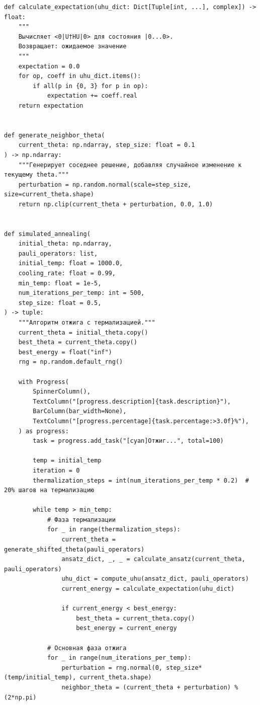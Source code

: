 \documentclass[a4paper]{report}
\begin{document}
\begin{lstlisting}
def calculate_expectation(uhu_dict: Dict[Tuple[int, ...], complex]) -> float:
    """
    Вычисляет <0|U†HU|0> для состояния |0...0>.
    Возвращает: ожидаемое значение
    """
    expectation = 0.0
    for op, coeff in uhu_dict.items():
        if all(p in {0, 3} for p in op):
            expectation += coeff.real
    return expectation


def generate_neighbor_theta(
    current_theta: np.ndarray, step_size: float = 0.1
) -> np.ndarray:
    """Генерирует соседнее решение, добавляя случайное изменение к текущему theta."""
    perturbation = np.random.normal(scale=step_size, size=current_theta.shape)
    return np.clip(current_theta + perturbation, 0.0, 1.0)


def simulated_annealing(
    initial_theta: np.ndarray,
    pauli_operators: list,
    initial_temp: float = 1000.0,
    cooling_rate: float = 0.99,
    min_temp: float = 1e-5,
    num_iterations_per_temp: int = 500,
    step_size: float = 0.5,
) -> tuple:
    """Алгоритм отжига с термализацией."""
    current_theta = initial_theta.copy()
    best_theta = current_theta.copy()
    best_energy = float("inf")
    rng = np.random.default_rng()

    with Progress(
        SpinnerColumn(),
        TextColumn("[progress.description]{task.description}"),
        BarColumn(bar_width=None),
        TextColumn("[progress.percentage]{task.percentage:>3.0f}%"),
    ) as progress:
        task = progress.add_task("[cyan]Отжиг...", total=100)

        temp = initial_temp
        iteration = 0
        thermalization_steps = int(num_iterations_per_temp * 0.2)  # 20% шагов на термализацию

        while temp > min_temp:
            # Фаза термализации
            for _ in range(thermalization_steps):
                current_theta = generate_shifted_theta(pauli_operators)
                ansatz_dict, _, _ = calculate_ansatz(current_theta, pauli_operators)
                uhu_dict = compute_uhu(ansatz_dict, pauli_operators)
                current_energy = calculate_expectation(uhu_dict)

                if current_energy < best_energy:
                    best_theta = current_theta.copy()
                    best_energy = current_energy

            # Основная фаза отжига
            for _ in range(num_iterations_per_temp):
                perturbation = rng.normal(0, step_size*(temp/initial_temp), current_theta.shape)
                neighbor_theta = (current_theta + perturbation) % (2*np.pi)


\end{lstlisting}
\end{document}
